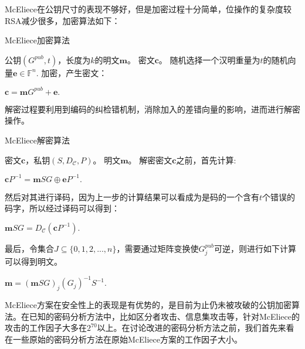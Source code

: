 McEliece在公钥尺寸的表现不够好，但是加密过程十分简单，位操作的复杂度较RSA减少很多，加密算法如下：

\begin{breakablealgorithm}
	\small
	\renewcommand{\algorithmicrequire}{\textbf{Input:}}
	\renewcommand{\algorithmicensure}{\textbf{Output:}}
	\caption{McEliece加密算法}
	\label{alg:McElieceEn}
	\begin{algorithmic}[1]
		\Require
		公钥$(G^{pub},t)$，长度为$k$的明文$\mathbf{m}$。
		\Ensure
		密文$\mathbf{c}$。
		\State
		随机选择一个汉明重量为$t$的随机向量$\mathbf{e} \in \mathbb{F}^n$.
		\State
		加密，产生密文：
		
		\centering $\mathbf{c} = \mathbf{m}G^{pub} + \mathbf{e}.$
	\end{algorithmic}
\end{breakablealgorithm}

解密过程要利用到编码的纠检错机制，消除加入的差错向量的影响，进而进行解密操作。

\begin{breakablealgorithm}
	\small
	\renewcommand{\algorithmicrequire}{\textbf{Input:}}
	\renewcommand{\algorithmicensure}{\textbf{Output:}}
	\caption{McEliece解密算法}
	\label{alg:McElieceDe}
	\begin{algorithmic}[1]
		\Require
		密文$\mathbf{c}$，私钥$(S,D_\mathcal{C},P)$。
		\Ensure
		明文$\mathbf{m}$。
		\State
		解密密文$\mathbf{c}$之前，首先计算:
		\begin{center}
			$\mathbf{c}P^{-1} = \mathbf{m}SG \oplus\textbf{e}P^{-1}.$
		\end{center}

		\State
		然后对其进行译码，因为上一步的计算结果可以看成为是码的一个含有$t$个错误的码字，所以经过译码可以得到：
		\begin{center}
			$\mathbf{m}SG = D_\mathcal{C}(\mathbf{c}P^{-1}).$
		\end{center}
		
		\State
		最后，令集合$J \subseteq \{0,1,2,...,n\}$，需要通过矩阵变换使$G_j^{pub}$可逆，则进行如下计算可以得到明文。
		\begin{center}
			$\mathbf{m} = (\mathbf{m}SG)_j(G_j)^{-1}S^{-1}.$
		\end{center}		
	\end{algorithmic}
\end{breakablealgorithm}

McEliece方案在安全性上的表现是有优势的\cite{Kobara2003On, OnTheMc, 2005纠错码的代数理论}，是目前为止仍未被攻破的公钥加密算法。在已知的密码分析方法中，比如区分者攻击、信息集攻击等，针对McEliece的攻击的工作因子大多在$2^{70}$以上。在讨论改进的密码分析方法之前，我们首先来看在一些原始的密码分析方法在原始McEliece方案的工作因子大小。


